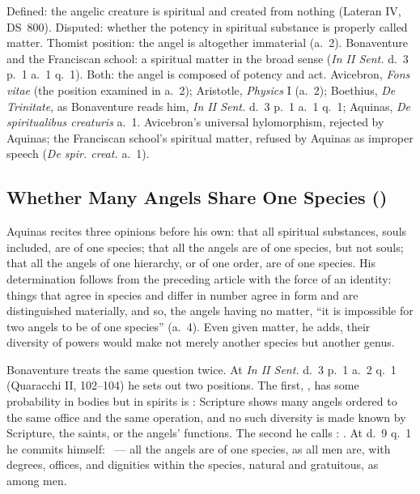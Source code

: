  {Defined: the angelic creature is spiritual and created from nothing
  (Lateran IV, DS~800). Disputed: whether the potency in spiritual
  substance is properly called matter. Thomist position: the angel is
  altogether immaterial (a.~2). Bonaventure and the Franciscan school: a
  spiritual matter in the broad sense (\emph{In II Sent.} d.~3 p.~1 a.~1
  q.~1). Both: the angel is composed of potency and act.}
 {Avicebron, \emph{Fons vitae} (the position examined in a.~2);
  Aristotle, \emph{Physics} I (a.~2); Boethius, \emph{De Trinitate}, as
  Bonaventure reads him, \emph{In II Sent.} d.~3 p.~1 a.~1 q.~1; Aquinas,
  \emph{De spiritualibus creaturis} a.~1.}
 {Avicebron's universal hylomorphism, rejected by Aquinas; the Franciscan
  school's spiritual matter, refused by Aquinas as improper speech
  (\emph{De spir. creat.} a.~1).}

\subsection{Whether Many Angels Share One Species ()}\label{sec:dq-species}

Aquinas recites three opinions before his own: that all spiritual
substances, souls included, are of one species; that all the angels are
of one species, but not souls; that all the angels of one hierarchy, or
of one order, are of one species. His determination follows from the
preceding article with the force of an identity: things that agree in
species and differ in number agree in form and are distinguished
materially, and so, the angels having no matter, ``it is impossible for
two angels to be of one species'' (a.~4). Even given matter, he adds,
their diversity of powers would make not merely another species but
another genus.

Bonaventure treats the same question twice. At \emph{In II Sent.} d.~3
p.~1 a.~2 q.~1 (Quaracchi II, 102--104) he sets out two positions. The first, , has some probability in bodies but in spirits is
: Scripture shows many angels ordered to the same
office and the same operation, and no such diversity is made known by
Scripture, the saints, or the angels' functions. The second he calls
: . At d.~9 q.~1 he commits himself: ~--- all the angels are of one species, as all men are, with
degrees, offices, and dignities within the species, natural and
gratuitous, as among men.


